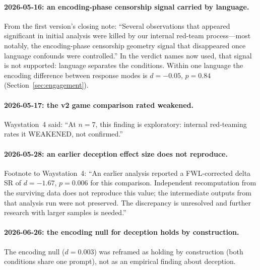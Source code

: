 \documentclass[11pt,a4paper]{article}
\begin{document}
\paragraph{2026-05-16: an encoding-phase censorship signal carried by language.}
From the first version's closing note: ``Several observations that
appeared significant in initial analysis were killed by our internal
red-team process---most notably, the encoding-phase censorship geometry
signal that disappeared once language confounds were controlled.'' In
the verdict names now used, that signal is not supported: language
separates the conditions. Within one language the encoding difference
between response modes is $d = -0.05$, $p = 0.84$
(Section~\ref{sec:engagement}).

\paragraph{2026-05-17: the v2 game comparison rated weakened.}
Waystation~4 said: ``At $n = 7$, this finding is exploratory: internal
red-teaming rates it WEAKENED, not confirmed.''

\paragraph{2026-05-28: an earlier deception effect size does not reproduce.}
Footnote to Waystation~4: ``An earlier analysis reported a FWL-corrected
delta SR of $d = -1.67$, $p = 0.006$ for this comparison. Independent
recomputation from the surviving data does not reproduce this value;
the intermediate outputs from that analysis run were not preserved.
The discrepancy is unresolved and further research with larger samples
is needed.''

\paragraph{2026-06-26: the encoding null for deception holds by construction.}
The encoding null ($d = 0.003$) was reframed as holding by construction
(both conditions share one prompt), not as an empirical finding about
deception.
\end{document}

